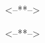\documentclass[14pt]{extarticle}
\begin{document}
\begin{center}
\Large
<--**-->
\end{center}
\vspace{10mm}



<--**-->
\end{document}
